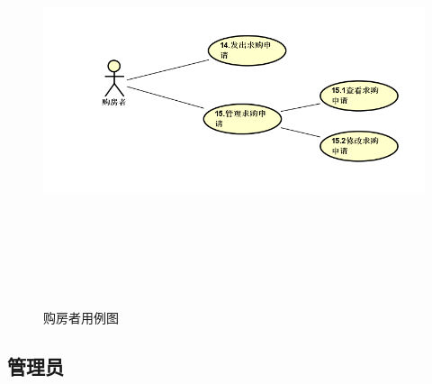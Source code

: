 \begin{figure}[htbp]

    \centering
    
    \includegraphics[height=12.0cm,width=14.0cm]{requirement/figures/goufangzhe.png} 
    \caption{购房者用例图}
    
    \end{figure}
    \newpage
\subsection{管理员}
 
